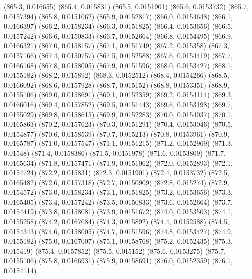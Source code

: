 {					(865.3, 0.016655)
					(865.4, 0.015831)
					(865.5, 0.0151901)
					(865.6, 0.0153732)
					(865.7, 0.0157394)
					(865.8, 0.0151062)
					(865.9, 0.0152817)
					(866.0, 0.0154648)
					(866.1, 0.0166397)
					(866.2, 0.0158234)
					(866.3, 0.0151825)
					(866.4, 0.0153656)
					(866.5, 0.0157242)
					(866.6, 0.0150833)
					(866.7, 0.0152664)
					(866.8, 0.0154495)
					(866.9, 0.0166321)
					(867.0, 0.0158157)
					(867.1, 0.0151749)
					(867.2, 0.015358)
					(867.3, 0.0157166)
					(867.4, 0.0150757)
					(867.5, 0.0152588)
					(867.6, 0.0154419)
					(867.7, 0.0166168)
					(867.8, 0.0158005)
					(867.9, 0.0151596)
					(868.0, 0.0153427)
					(868.1, 0.0155182)
					(868.2, 0.015892)
					(868.3, 0.0152512)
					(868.4, 0.0154266)
					(868.5, 0.0166092)
					(868.6, 0.0157928)
					(868.7, 0.015152)
					(868.8, 0.0153351)
					(868.9, 0.0155106)
					(869.0, 0.0158691)
					(869.1, 0.0152359)
					(869.2, 0.0154114)
					(869.3, 0.0166016)
					(869.4, 0.0157852)
					(869.5, 0.0151443)
					(869.6, 0.0153198)
					(869.7, 0.0155029)
					(869.8, 0.0158615)
					(869.9, 0.0152283)
					(870.0, 0.0154037)
					(870.1, 0.0165863)
					(870.2, 0.0157623)
					(870.3, 0.0151291)
					(870.4, 0.0153046)
					(870.5, 0.0154877)
					(870.6, 0.0158539)
					(870.7, 0.015213)
					(870.8, 0.0153961)
					(870.9, 0.0165787)
					(871.0, 0.0157547)
					(871.1, 0.0151215)
					(871.2, 0.0152969)
					(871.3, 0.01548)
					(871.4, 0.0158386)
					(871.5, 0.0151978)
					(871.6, 0.0153809)
					(871.7, 0.0165634)
					(871.8, 0.0157471)
					(871.9, 0.0151062)
					(872.0, 0.0152893)
					(872.1, 0.0154724)
					(872.2, 0.015831)
					(872.3, 0.0151901)
					(872.4, 0.0153732)
					(872.5, 0.0165482)
					(872.6, 0.0157318)
					(872.7, 0.0150909)
					(872.8, 0.015274)
					(872.9, 0.0154572)
					(873.0, 0.0158234)
					(873.1, 0.0151825)
					(873.2, 0.0153656)
					(873.3, 0.0165405)
					(873.4, 0.0157242)
					(873.5, 0.0150833)
					(873.6, 0.0152664)
					(873.7, 0.0154419)
					(873.8, 0.0158081)
					(873.9, 0.0151672)
					(874.0, 0.0153503)
					(874.1, 0.0155258)
					(874.2, 0.0167084)
					(874.3, 0.015892)
					(874.4, 0.0152588)
					(874.5, 0.0154343)
					(874.6, 0.0158005)
					(874.7, 0.0151596)
					(874.8, 0.0153427)
					(874.9, 0.0155182)
					(875.0, 0.0167007)
					(875.1, 0.0158768)
					(875.2, 0.0152435)
					(875.3, 0.015419)
					(875.4, 0.0157852)
					(875.5, 0.015152)
					(875.6, 0.0153275)
					(875.7, 0.0155106)
					(875.8, 0.0166931)
					(875.9, 0.0158691)
					(876.0, 0.0152359)
					(876.1, 0.0154114)
}
